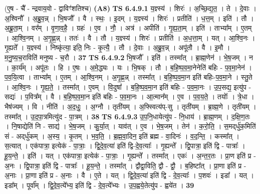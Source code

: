 \documentclass[17pt]{extarticle}
\begin{document}
                  \newline
                      (ए॒ष - चै᳚ - न्द्रवाय॒वो - द्वाविꣳ॑शतिश्च)  \textbf{(A8)} \newline \newline
                                \textbf{ TS 6.4.9.1} \newline
                  य॒ज्ञ्स्य॑ । शिरः॑ । अ॒च्छि॒द्य॒त॒ । ते । दे॒वाः । अ॒श्विनौ᳚ । अ॒ब्रु॒व॒न्न् । भि॒षजौ᳚ । वै । स्थः॒ । इ॒दम् । य॒ज्ञ्स्य॑ । शिरः॑ । प्रतीति॑ । ध॒त्त॒म् । इति॑ । तौ । अ॒ब्रू॒ता॒म् । वर᳚म् । वृ॒णा॒व॒है॒ । ग्रहः॑ । ए॒व । नौ॒ । अत्र॑ । अपीति॑ । गृ॒ह्य॒ता॒म् । इति॑ । ताभ्या᳚म् । ए॒तम् । आ॒श्वि॒नम् । अ॒गृ॒ह्ण॒न्न् । ततः॑ । वै । तौ । य॒ज्ञ्स्य॑ । शिरः॑ । प्रतीति॑ । अ॒ध॒त्ता॒म् । यत् । आ॒श्वि॒नः । गृ॒ह्यते᳚ । य॒ज्ञ्स्य॑ । निष्कृ॑त्या॒ इति॒ निः - कृ॒त्यै॒ । तौ । दे॒वाः । अ॒ब्रु॒व॒न्न् । अपू॑तौ । वै । इ॒मौ । म॒नु॒ष्य॒च॒राविति॑ मनुष्य - च॒रौ । \textbf{  37} \newline
                  \newline
                                \textbf{ TS 6.4.9.2} \newline
                  भि॒षजौ᳚ । इति॑ । तस्मा᳚त् । ब्रा॒ह्म॒णेन॑ । भे॒ष॒जम् । न । का॒र्य᳚म् । अपू॑तः । हि । ए॒षः । अ॒मे॒द्ध्यः । यः । भि॒षक् । तौ । ब॒हि॒ष्प॒व॒मा॒नेनेति॑ बहिः - प॒व॒मा॒नेन॑ । प॒व॒यि॒त्वा । ताभ्या᳚म् । ए॒तम् । आ॒श्वि॒नम् । अ॒गृ॒ह्ण॒न्न् । तस्मा᳚त् । ब॒हि॒ष्प॒व॒मा॒न इति॑ बहिः-प॒व॒मा॒ने । स्तु॒ते । आ॒श्वि॒नः । गृ॒ह्य॒ते॒ । तस्मा᳚त् । ए॒वम् । वि॒दुषा᳚ । ब॒हि॒ष्प॒व॒मा॒न इति॑ बहिः - प॒व॒मा॒नः । उ॒प॒सद्य॒ इत्यु॑प - सद्यः॑ । प॒वित्र᳚म् । वै । ब॒हि॒ष्प॒व॒मा॒न इति॑ बहिः - प॒व॒मा॒नः । आ॒त्मान᳚म् । ए॒व । प॒व॒य॒ते॒ । तयोः᳚ । त्रे॒धा । भैष॑ज्यम् । वि । नीति॑ । अ॒द॒धुः॒ । अ॒ग्नौ । तृती॑यम् । अ॒फ्स्वित्य॑प्-सु । तृती॑यम् । ब्रा॒ह्म॒णे । तृती॑यम् । तस्मा᳚त् । उ॒द॒पा॒त्रमित्यु॑द - पा॒त्रम् । \textbf{  38} \newline
                  \newline
                                \textbf{ TS 6.4.9.3} \newline
                  उ॒प॒नि॒धायेत्यु॑प - नि॒धाय॑ । ब्रा॒ह्म॒णम् । द॒क्षि॒ण॒तः । नि॒षाद्येति॑ नि - साद्य॑ । भे॒ष॒जम् । कु॒र्या॒त् । याव॑त् । ए॒व । भे॒ष॒जम् । तेन॑ । क॒रो॒ति॒ । स॒मद्‌र्धु॑क॒मिति॑ सं - अद्‌र्धु॑कम् । अ॒स्य॒ । कृ॒तम् । भ॒व॒ति॒ । ब्र॒ह्म॒वा॒दिन॒ इति॑ ब्रह्म - वा॒दिनः॑ । व॒द॒न्ति॒ । कस्मा᳚त् । स॒त्यात् । एक॑पात्रा॒ इत्येक॑ - पा॒त्राः॒ । द्वि॒दे॒व॒त्या॑ इति॑ द्वि-दे॒व॒त्याः᳚ । गृ॒ह्यन्ते᳚ । द्वि॒पात्रा॒ इति॑ द्वि - पात्राः᳚ । हू॒य॒न्ते॒ । इति॑ । यत् । एक॑पात्रा॒ इत्येक॑ - पा॒त्राः॒ । गृ॒ह्यन्ते᳚ । तस्मा᳚त् । एकः॑ । अ॒न्त॒र॒तः । प्रा॒ण इति॑ प्र - अ॒नः । द्वि॒पात्रा॒ इति॑ द्वि - पात्राः᳚ । हू॒य॒न्ते॒ । तस्मा᳚त् । द्वौद्वा॒विति॒ द्वौ - द्वौ॒ । ब॒हिष्टा᳚त् । प्रा॒णा इति॑ प्र - अ॒नाः । प्रा॒णा इति॑ प्र - अ॒नाः । वै । ए॒ते । यत् । द्वि॒दे॒व॒त्या॑ इति॑ द्वि - दे॒व॒त्याः᳚ । प॒शवः॑ । इडा᳚ । यत् । इडा᳚म् । पूर्वा᳚म् । द्वि॒दे॒व॒त्ये᳚भ्य॒ इति॑ द्वि - दे॒व॒त्ये᳚भ्यः । उ॒प॒ह्वये॒तेत्यु॑प - ह्वये॑त । \textbf{  39} \newline
\end{document}
